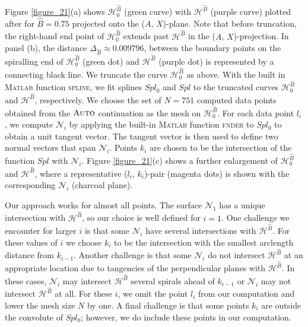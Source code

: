 \documentclass{ws-ijbc}
\begin{document}
Figure \ref{figure_21}(a) shows $\mathscr{H}_0^{\widehat{B}}$ (green curve) with $\mathscr{H}^{\widehat{B}}$ (purple curve) plotted after for $\widehat{B}=0.75$  projected onto the ($A$, $X$)-plane.  Note that before truncation, the right-hand end point of $\mathscr{H}_0^{\widehat{B}}$ extends past $\mathscr{H}^{\widehat{B}}$ in the ($A$, $X$)-projection.  In panel (b), the distance $\Delta_{\widehat{B}} \approx 0.009796$, between the boundary points on the spiralling end of $\mathscr{H}_0^{\widehat{B}}$ (green dot) and $\mathscr{H}^{\widehat{B}}$ (purple dot) is represented by a connecting black line.  We truncate the curve $\mathscr{H}_0^{\widehat{B}}$ as above.  With the built in \textsc{Matlab} function \textsc{spline}, we fit splines $Spl_0$ and $Spl$ to the truncated curves $\mathscr{H}_0^{\widehat{B}}$ and $\mathscr{H}^{\widehat{B}}$, respectively.  We choose the set of $N=751$ computed data points obtained from the $\textsc{Auto}$ continuation as the mesh on $\mathscr{H}_0^{\widehat{B}}$.  For each data point $l_i$, we compute $\mathscr{N}_i$ by applying the built-in \textsc{Matlab} function \textsc{fnder} to $Spl_0$ to obtain a unit tangent vector.  The tangent vector is then used to define two normal vectors that span $\mathscr{N}_i$.  Points $k_i$ are chosen to be the intersection of the function $Spl$ with $\mathscr{N}_i$. Figure \ref{figure_21}(c) shows a further enlargement of $\mathscr{H}_0^{\widehat{B}}$ and $\mathscr{H}^{\widehat{B}}$, where a representative ($l_i$, $k_i$)-pair (magenta dots) is shown with the corresponding $\mathscr{N}_i$ (charcoal plane).

Our approach works for almost all points.  The surface $\mathscr{N}_1$ has a unique intersection with $\mathscr{H}^{\widehat{B}}$, so our choice is well defined for $i=1$.  One challenge we encounter for larger $i$ is that some $\mathscr{N}_i$ have several intersections with $\mathscr{H}^{\widehat{B}}$.  For these values of $i$ we choose $k_i$ to be the intersection with the smallest arclength distance from $k_{i-1}$.  Another challenge is that some $\mathscr{N}_i$ do not intersect $\mathscr{H}^{\widehat{B}}$ at an appropriate location due to tangencies of the perpendicular planes with $\mathscr{H}^{\widehat{B}}$.  In these cases, $\mathscr{N}_i$ may intersect $\mathscr{H}^{\widehat{B}}$ several spirals ahead of $k_{i-1}$ or $\mathscr{N}_i$ may not intersect $\mathscr{H}^{\widehat{B}}$ at all.  For these $i$, we omit the point $l_i$ from our computation and lower the mesh size $N$ by one.    A final challenge is that some points $k_i$ are outside the convolute of $Spl_0$; however, we do include these points in our computation.
\end{document}
